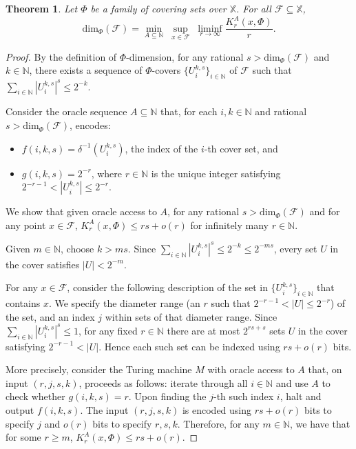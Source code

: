 \documentclass[11pt]{article}
\newtheorem{theorem}{Theorem}
\newcommand{\N}{\mathbb{N}}
\renewcommand{\dim}{{\mathrm{dim}}}
\newcommand{\F}{{\mathcal{F}}}
\newcommand{\X}{{\mathbb{X}}}
\renewcommand{\F}{\mathcal{F}}
\newcommand{\U}{U}
\newcommand{\x}{x}
\begin{document}
\begin{theorem}\label{thm:pspforPhidim}
	Let $\Phi$ be a family of  covering sets over $\X$. For all $\mathcal{F} \subseteq \X$, 
	$$\dim_\Phi(\mathcal{F}) = \min\limits_{A \subseteq \N} \; \sup\limits_{\x \in \mathcal{F}} \; \liminf_{r \rightarrow \infty} \frac{K_r^A(\x, \Phi)}{r}.$$
\end{theorem}
\begin{proof}
	
	By the definition of $\Phi$-dimension, for any rational $s > \dim_\Phi(\mathcal{F})$ and $k \in \mathbb{N}$, there exists a sequence of $\Phi$-covers $\{\U_i^{k,s}\}_{i \in \mathbb{N}}$ of $\mathcal{F}$ such that
	\(
	\sum_{i \in \mathbb{N}} |\U_i^{k,s}|^s \leq 2^{-k}.
	\)
	
	 Consider the oracle sequence $A \subseteq \mathbb{N}$ that, for each $i, k \in \mathbb{N}$ and rational $s > \dim_\Phi(\mathcal{F})$, encodes:
	\begin{itemize}
		\item $f(i,k,s) = \delta^{-1}(\U_i^{k,s})$, the index of the $i$-th cover set, and
		\item $g(i,k,s) = 2^{-r}$, where $r \in \mathbb{N}$ is the unique integer satisfying $2^{-r-1} < |\U_i^{k,s}| \leq 2^{-r}$.
	\end{itemize}

	We show that given oracle access to $A$, for any rational $s > \dim_\Phi(\mathcal{F})$ and	for any point $x \in \F$, ${K_r^A(\x, \Phi)} \leq rs + o(r)$ for infinitely many $r \in \N$.
	
	Given $m \in \mathbb{N}$, choose $k > ms$. Since $\sum_{i \in \mathbb{N}} |\U_i^{k,s}|^s \leq 2^{-k} \leq 2^{-ms}$, every set $U$ in the cover satisfies $|U| < 2^{-m}$.
		
	
	For any $x \in \F$, consider the following description of the set in $\{\U_i^{k,s}\}_{i \in \mathbb{N}}$ that contains $x$. We specify the diameter range (an $r$ such that $2^{-r-1} < |U| \leq 2^{-r}$) of the set, and an index $j$ within sets of that diameter range. 
	Since $\sum_{i \in \mathbb{N}} |\U_i^{k,s}|^s \leq 1$, for any fixed $r \in \mathbb{N}$ there are at most $2^{rs + s} $ sets $U$ in the cover satisfying $2^{-r-1} < |U|$. Hence each such set can be indexed using $rs + o(r)$ bits. 
	
	More precisely, consider the Turing machine $M$ with oracle access to $A$ that, on input $(r, j, s, k)$, proceeds as follows: iterate through all $i \in \mathbb{N}$ and use $A$ to check whether $g(i,k,s) = r$. Upon finding the $j$-th such index $i$, halt and output $f(i,k,s)$.
	The input $(r, j, s, k)$ is encoded using $rs + o(r)$ bits to specify $j$ and $o(r)$ bits to specify $r,s,k$. Therefore, for any $m \in \N$, we have that for some $r \geq m$, $K_r^A(x, \Phi) \leq rs + o(r)$.
	

\end{proof}
\end{document}
